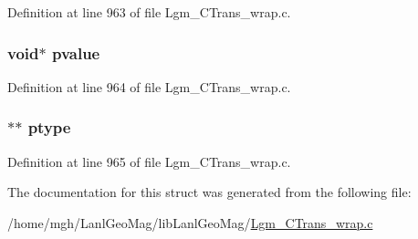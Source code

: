 Definition at line 963 of file Lgm\_\-CTrans\_\-wrap.c.\hypertarget{structswig__const__info_728d7ae5aaef6e9bdb0ec8a4e5c429b7}{
\subsubsection[{pvalue}]{\setlength{\rightskip}{0pt plus 5cm}void$\ast$ {\bf pvalue}}}
\label{structswig__const__info_728d7ae5aaef6e9bdb0ec8a4e5c429b7}




Definition at line 964 of file Lgm\_\-CTrans\_\-wrap.c.\hypertarget{structswig__const__info_d55d59eb3cf7a2bb1fa92d92d42e782b}{
\subsubsection[{ptype}]{$\ast$$\ast$ {\bf ptype}}}
\label{structswig__const__info_d55d59eb3cf7a2bb1fa92d92d42e782b}




Definition at line 965 of file Lgm\_\-CTrans\_\-wrap.c.

The documentation for this struct was generated from the following file:\begin{CompactItemize}
\item 
/home/mgh/LanlGeoMag/libLanlGeoMag/\hyperlink{_lgm___c_trans__wrap_8c}{Lgm\_\-CTrans\_\-wrap.c}\end{CompactItemize}
